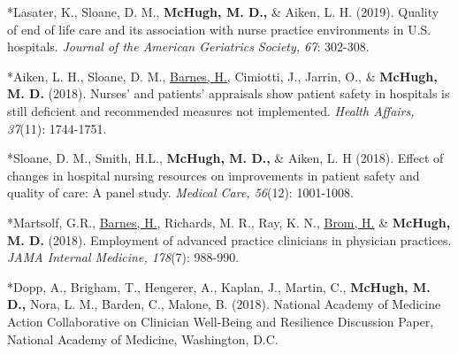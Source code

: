 \documentclass[10pt,]{article}
\begin{document}
{{{{{{{{{{{{{{{\begin{hangparas}{.25in}{1}
*Lasater, K., Sloane, D. M., {\textbf {McHugh, M. D.,}} \& Aiken, L. H. (2019). Quality of end of life care and its association with nurse practice environments in U.S. hospitals. {\textit {Journal of the American Geriatrics Society, 67}}: 302-308.

\end{hangparas}

\vspace{4mm}

\begin{hangparas}{.25in}{1}

*Aiken, L. H., Sloane, D. M., {\underline {Barnes, H.}}, Cimiotti, J., Jarrin, O., \& {\textbf {McHugh, M. D.}} (2018). Nurses’ and patients’ appraisals show patient safety in hospitals is still deficient and recommended measures not implemented. {\textit {Health Affairs, 37}}(11): 1744-1751.

\end{hangparas}

\vspace{4mm}

\begin{hangparas}{.25in}{1}

*Sloane, D. M., Smith, H.L., {\textbf {McHugh, M. D.,}} \& Aiken, L. H (2018). Effect of changes in hospital nursing resources on improvements in patient safety and quality of care: A panel study. {\textit {Medical Care, 56}}(12): 1001-1008.

\end{hangparas}

\vspace{4mm}

\begin{hangparas}{.25in}{1}

*Martsolf, G.R., {\underline {Barnes, H.}}, Richards, M. R., Ray, K. N., {\underline {Brom, H.}} \& {\textbf {McHugh, M. D.}} (2018). Employment of advanced practice clinicians in physician practices. {\textit {JAMA Internal Medicine, 178}}(7): 988-990.

\end{hangparas}

\vspace{4mm}

\begin{hangparas}{.25in}{1}

*Dopp, A., Brigham, T., Hengerer, A., Kaplan, J., Martin, C., {\textbf {McHugh, M. D.,}} Nora, L. M., Barden, C., Malone, B. (2018). National Academy of Medicine Action Collaborative on Clinician Well-Being and Resilience Discussion Paper, National Academy of Medicine, Washington, D.C.


\end{hangparas}}}}}}}}}}}}}}}}
\end{document}
